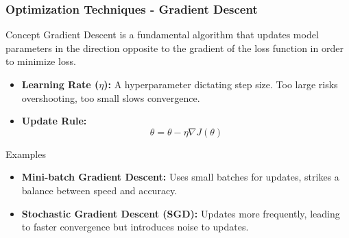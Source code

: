\documentclass[aspectratio=169]{beamer}
\begin{document}
\begin{frame}[fragile]
    \frametitle{Optimization Techniques - Gradient Descent}
    \begin{block}{Concept}
        Gradient Descent is a fundamental algorithm that updates model parameters in the direction opposite to the gradient of the loss function in order to minimize loss.
    \end{block}
    
    \begin{itemize}
        \item \textbf{Learning Rate ($\eta$):} A hyperparameter dictating step size. Too large risks overshooting, too small slows convergence.
        \item \textbf{Update Rule:} 
            \begin{equation}
            \theta = \theta - \eta \nabla J(\theta)
            \end{equation}
        \end{itemize}
        
        \begin{block}{Examples}
            \begin{itemize}
                \item \textbf{Mini-batch Gradient Descent:} Uses small batches for updates, strikes a balance between speed and accuracy.
                \item \textbf{Stochastic Gradient Descent (SGD):} Updates more frequently, leading to faster convergence but introduces noise to updates.
            \end{itemize}
        \end{block}
\end{frame}
\end{document}
